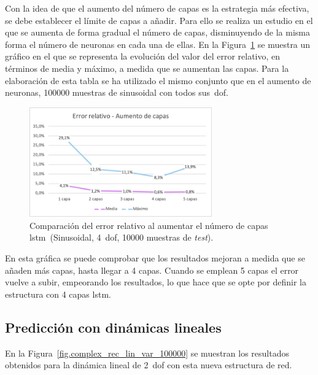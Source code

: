 Con la idea de que el aumento del número de capas es la estrategia más efectiva, se debe establecer el límite de capas a añadir. Para ello se realiza un estudio en el que se aumenta de forma gradual el número de capas, disminuyendo de la misma forma el número de neuronas en cada una de ellas. En la Figura~\ref{fig.capas_mod} se muestra un gráfico en el que se representa la evolución del valor del error relativo, en términos de media y máximo, a medida que se aumentan las capas. Para la elaboración de esta tabla se ha utilizado el mismo conjunto que en el aumento de neuronas, 100000 muestras de sinusoidal con todos sus~\acrshort{dof}.

\begin{figure}[H]
		\begin{center}
			\includegraphics[width=0.7\textwidth]{ figures/test_mod/REC/complex/capas_mod.png}
			\caption{Comparación del error relativo al aumentar el número de capas \acrshort{lstm}~(Sinusoidal, 4~\acrshort{dof}, 10000 muestras de \textit{test}).}
			\label{fig.capas_mod}
		\end{center}
\end{figure}
\vspace{-10pt}

En esta gráfica se puede comprobar que los resultados mejoran a medida que se añaden más capas, hasta llegar a 4 capas. Cuando se emplean 5 capas el error vuelve a subir, empeorando los resultados, lo que hace que se opte por definir la estructura con 4 capas \acrshort{lstm}.

\subsection{Predicción con dinámicas lineales}
En la Figura~\ref{fig.complex_rec_lin_var_100000} se muestran los resultados obtenidos para la dinámica lineal de 2~\acrshort{dof} con esta nueva estructura de red.

